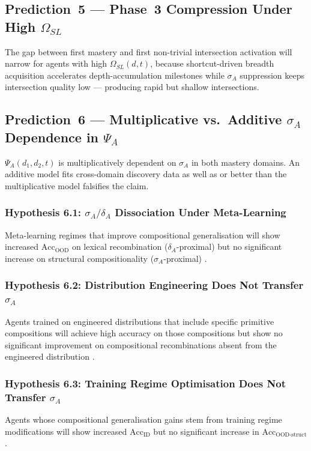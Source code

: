 \documentclass[10pt]{article}
\begin{document}
\subsection{Prediction~5 --- Phase~3 Compression Under High \texorpdfstring{$\Omega_{SL}$}{Omega\_SL}}
The gap between first mastery and first non-trivial intersection
activation will narrow for agents with high $\Omega_{SL}(d,t)$, because shortcut-driven breadth acquisition accelerates depth-accumulation milestones while $\sigma_A$ suppression keeps intersection quality low --- producing rapid but shallow intersections.

\subsection{Prediction~6 --- Multiplicative vs.\ Additive \texorpdfstring{$\sigma_A$}{sigma\_A}
Dependence in \texorpdfstring{$\Psi_A$}{Psi\_A}}
$\Psi_A(d_1,d_2,t)$ is multiplicatively dependent on $\sigma_A$ in both
mastery domains. An additive model fits cross-domain discovery data as
well as or better than the multiplicative model falsifies the claim.

\subsubsection*{Hypothesis 6.1: \texorpdfstring{$\sigma_A/\delta_A$}{sigma\_A/delta\_A} Dissociation Under Meta-Learning}
Meta-learning regimes that improve compositional generalisation will
show increased $\text{Acc}_{\text{OOD}}$ on lexical recombination
($\delta_A$-proximal) but no significant increase on structural
compositionality ($\sigma_A$-proximal)
\citep{lake2023humanlikesystematicgeneralization}.

\subsubsection*{Hypothesis 6.2: Distribution Engineering Does Not Transfer \texorpdfstring{$\sigma_A$}{sigma\_A}}
Agents trained on engineered distributions that include specific
primitive compositions will achieve high accuracy on those compositions
but show no significant improvement on compositional recombinations
absent from the engineered distribution
\citep{patel2022revisitingcompositionalgeneralization}.

\subsubsection*{Hypothesis 6.3: Training Regime Optimisation Does Not Transfer \texorpdfstring{$\sigma_A$}{sigma\_A}}
Agents whose compositional generalisation gains stem from training regime
modifications will show increased $\text{Acc}_{\text{ID}}$ but no
significant increase in $\text{Acc}_{\text{OOD-struct}}$.
\end{document}
